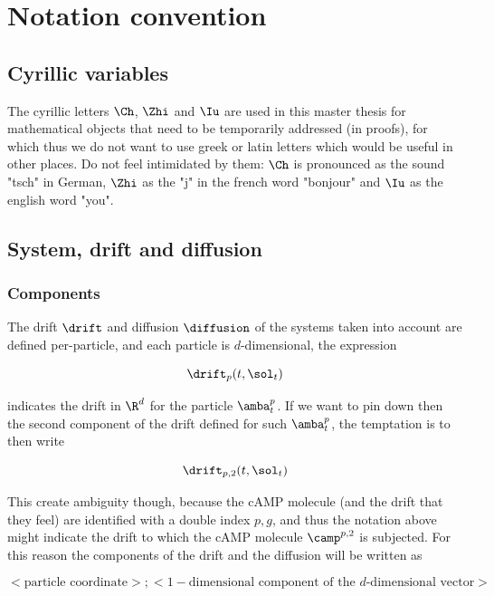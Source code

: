 \section{Notation convention}\label{app:notation}

\subsection{Cyrillic variables}

The cyrillic letters $\Ch$, $\Zhi$ and $\Iu$ are used in this master thesis for mathematical objects that need to be temporarily addressed (\eg in proofs), for which thus we do not want to use greek or latin letters which would be useful in other places.
Do not feel intimidated by them: $\Ch$ is pronounced as the sound "tsch" in German, $\Zhi$ as the "j" in the french word "bonjour" and $\Iu$ as the english word "you".

\subsection{System, drift and diffusion}

\subsubsection{Components}

The drift $\drift$ and diffusion $\diffusion$ of the systems taken into account are defined per-particle, and each particle is $d$-dimensional, \eg the expression 

\begin{equation*}
	\drift_{p}(t, \sol_t)
\end{equation*}

indicates the drift in $\R^d$ for the particle $\amba_t^p$.
If we want to pin down then the second component of the drift defined for such $\amba_t^p$, the temptation is to then write

\begin{equation*}
	\drift_{p,2}(t, \sol_t)
\end{equation*}

This create ambiguity though, because the cAMP molecule (and the drift that they feel) are identified with a double index $p,g$, and thus the notation above might indicate the drift to which the cAMP molecule $\camp^{p,2}$ is subjected.
For this reason the components of the drift and the diffusion will be written as 

\begin{equation*}
	<\text{particle coordinate}>; <1-\text{dimensional component of the $d$-dimensional vector}>
\end{equation*}

